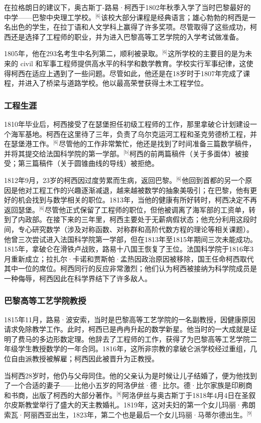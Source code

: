 在拉格朗日的建议下，奥古斯丁-路易·柯西于1802年秋季入学了当时巴黎最好的中学——巴黎中央理工学校。\(^\text{[6]}\)该校大部分课程是经典语言；雄心勃勃的柯西是一名出色的学生，在拉丁语和人文学科上赢得了许多奖项。尽管取得了这些成功，柯西还是选择了工程师的职业，并为进入巴黎高等工艺学院的入学考试做准备。

1805年，他在293名考生中名列第二，顺利被录取。\(^\text{[6]}\)这所学校的主要目的是为未来的 civil 和军事工程师提供高水平的科学和数学教育。学校实行军事纪律，这使得柯西在适应上遇到了一些问题。尽管如此，他还是在18岁时于1807年完成了课程，并进入了桥梁与道路学校。他以最高荣誉获得土木工程学位。
\subsubsection{工程生涯}  
1810年毕业后，柯西接受了在瑟堡担任初级工程师的工作，那里拿破仑计划建设一个海军基地。柯西在这里待了三年，负责了乌尔克运河工程和圣克劳德桥工程，并在瑟堡港工作。\(^\text{[6]}\)尽管他的工作非常繁忙，他还是找到了时间准备三篇数学稿件，并将其提交给法国科学院的第一学部。\(^\text{[b]}\)柯西的前两篇稿件（关于多面体）被接受；第三篇稿件（关于圆锥曲线的导线）被拒绝。

1812年9月，23岁的柯西因过度劳累而生病，返回巴黎。\(^\text{[6]}\)他回到首都的另一个原因是他对工程工作的兴趣逐渐减退，越来越被数学的抽象美吸引；在巴黎，他有更好的机会找到与数学相关的职位。1813年，当他的健康有所好转时，柯西决定不再返回瑟堡。\(^\text{[6]}\)尽管他正式保留了工程师的职位，但他被调离了海军部的工资单，转到了内政部。在接下来的三年里，柯西主要处于无薪病假状态；他充分利用这段时间，专心研究数学（涉及对称函数、对称群和高阶代数方程的理论等相关课题）。他曾三次尝试进入法国科学院第一学部，但在1813年至1815年期间三次未能成功。1815年，拿破仑在滑铁卢战败，路易十八国王恢复了王位。法国科学院于1816年3月重新成立；拉扎尔·卡诺和贾斯帕·孟热因政治原因被移除，国王任命柯西取代其中一位的席位。柯西同行的反应非常激烈；他们认为柯西被接纳为科学院成员是一种侮辱，柯西因此在科学界结下了许多敌人。
\subsubsection{巴黎高等工艺学院教授}  
1815年11月，路易·波安索，当时是巴黎高等工艺学院的一名副教授，因健康原因请求免除教学工作。此时，柯西已是冉冉升起的数学新星。他当时的一大成就是证明了费马的多边形数定理。他辞去了工程师的工作，获得了为巴黎高等工艺学院二年级学生教授数学的一年合同。1816年，这所非宗教的拿破仑派学校经过重组，几位自由派教授被解雇；柯西因此被晋升为正教授。

当柯西28岁时，他仍与父母同住。他的父亲认为是时候让儿子结婚了，便为他找到了一个合适的妻子——比他小五岁的阿洛伊丝·德·比尔。德·比尔家族是印刷商和书商，出版了柯西的大部分著作。\(^\text{[8]}\)阿洛伊丝与奥古斯丁于1818年4月4日在圣叙尔皮斯教堂举行了盛大的天主教婚礼。1819年，这对夫妇的第一个女儿玛丽·弗朗索瓦·阿丽西亚出生，1823年，第二个也是最后一个女儿玛丽·马蒂尔德出生。\(^\text{[9]}\)

